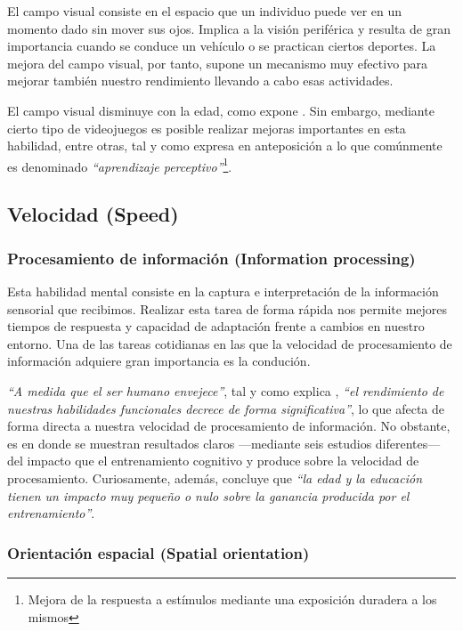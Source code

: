El campo visual consiste en el espacio que un individuo puede ver en un momento dado sin mover sus ojos. Implica a la visión periférica y resulta de gran importancia cuando se conduce un vehículo o se practican ciertos deportes. La mejora del campo visual, por tanto, supone un mecanismo muy efectivo para mejorar también nuestro rendimiento llevando a cabo esas actividades.

El campo visual disminuye con la edad, como expone \cite{Ball1988}. Sin embargo, mediante cierto tipo de videojuegos es posible realizar mejoras importantes en esta habilidad, entre otras, tal y como expresa \cite{Green2003} en anteposición a lo que comúnmente es denominado {\it ``aprendizaje perceptivo''}\footnote{Mejora de la respuesta a estímulos mediante una exposición duradera a los mismos}.

\subsection{Velocidad (Speed)}

\subsubsection{Procesamiento de información (Information processing)}


Esta habilidad mental consiste en la captura e interpretación de la información sensorial que recibimos. Realizar esta tarea de forma rápida nos permite mejores tiempos de respuesta y capacidad de adaptación frente a cambios en nuestro entorno. Una de las tareas cotidianas en las que la velocidad de procesamiento de información adquiere gran importancia es la condución.

{\it ``A medida que el ser humano envejece''}, tal y como explica \cite{Wood2005}, {\it ``el rendimiento de nuestras habilidades funcionales decrece de forma significativa''}, lo que afecta de forma directa a nuestra velocidad de procesamiento de información. No obstante, es en \cite{Karlene2007} donde se muestran resultados claros ---mediante seis estudios diferentes--- del impacto que el entrenamiento cognitivo y produce sobre la velocidad de procesamiento. Curiosamente, además, concluye que {\it ``la edad y la educación tienen un impacto muy pequeño o nulo sobre la ganancia producida por el entrenamiento''}.

\subsubsection{Orientación espacial (Spatial orientation)}

